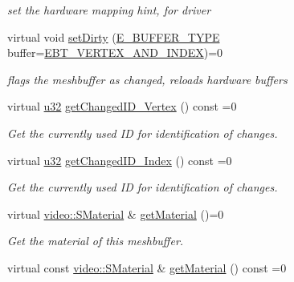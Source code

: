 \begin{DoxyCompactItemize}
\begin{DoxyCompactList}\small\item\em set the hardware mapping hint, for driver \end{DoxyCompactList}\item 
\mbox{\label{classirr_1_1scene_1_1IMeshBuffer_a21c9395d9751082ce3feecf33351f918}} 
virtual void \hyperlink{classirr_1_1scene_1_1IMeshBuffer_a21c9395d9751082ce3feecf33351f918}{set\+Dirty} (\hyperlink{namespaceirr_1_1scene_a8f59a89ffef0ad8e5b2c2cb874a93e8c}{E\+\_\+\+B\+U\+F\+F\+E\+R\+\_\+\+T\+Y\+PE} buffer=\hyperlink{namespaceirr_1_1scene_a8f59a89ffef0ad8e5b2c2cb874a93e8ca34ea664123fbc28610408e51b014dcdd}{E\+B\+T\+\_\+\+V\+E\+R\+T\+E\+X\+\_\+\+A\+N\+D\+\_\+\+I\+N\+D\+EX})=0
\begin{DoxyCompactList}\small\item\em flags the meshbuffer as changed, reloads hardware buffers \end{DoxyCompactList}\item 
virtual \hyperlink{namespaceirr_a0416a53257075833e7002efd0a18e804}{u32} \hyperlink{classirr_1_1scene_1_1IMeshBuffer_aba48df31edf92a0117692c0be02298db}{get\+Changed\+I\+D\+\_\+\+Vertex} () const =0
\begin{DoxyCompactList}\small\item\em Get the currently used ID for identification of changes. \end{DoxyCompactList}\item 
virtual \hyperlink{namespaceirr_a0416a53257075833e7002efd0a18e804}{u32} \hyperlink{classirr_1_1scene_1_1IMeshBuffer_acc389d76856dfb06c3ba45a92315e6d8}{get\+Changed\+I\+D\+\_\+\+Index} () const =0
\begin{DoxyCompactList}\small\item\em Get the currently used ID for identification of changes. \end{DoxyCompactList}\item 
virtual \hyperlink{classirr_1_1video_1_1SMaterial}{video\+::\+S\+Material} \& \hyperlink{classirr_1_1scene_1_1IMeshBuffer_a26fd922f00fde56abbbbbe40b485238b}{get\+Material} ()=0
\begin{DoxyCompactList}\small\item\em Get the material of this meshbuffer. \end{DoxyCompactList}\item 
virtual const \hyperlink{classirr_1_1video_1_1SMaterial}{video\+::\+S\+Material} \& \hyperlink{classirr_1_1scene_1_1IMeshBuffer_a341c1da2fd0cd556a15aab06d07dbbaa}{get\+Material} () const =0

\end{DoxyCompactItemize}
